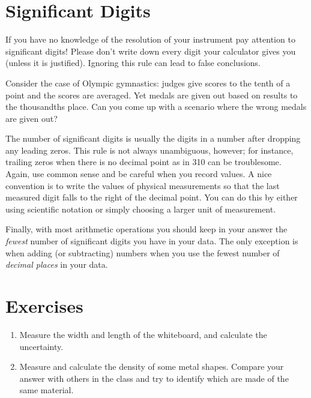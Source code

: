 \section{Significant Digits}

If you have no knowledge of the resolution of your instrument pay attention to significant
digits!  Please don't write down every digit your calculator gives you (unless
it is justified).  Ignoring this rule can lead to false conclusions.

Consider the case of Olympic gymnastics: judges give scores to the tenth of a
point and the scores are averaged.  Yet medals are given out based on results to
the thousandths place.  Can you come up with a scenario where the wrong medals
are given out?

The number of significant digits is usually the digits in a number after
dropping any leading zeros.  This rule is not always unambiguous, however; for
instance, trailing zeros when there is no decimal point as in 310 can be
troublesome.  Again, use common sense and be careful when you record values.  A
nice convention is to write the values of physical measurements so that the last
measured digit falls to the right of the decimal point.  You can do this by
either using scientific notation or simply choosing a larger unit of
measurement.

Finally, with most arithmetic operations you should keep in your answer the {\em
  fewest} number of significant digits you have in your data.  The only
exception is when adding (or subtracting) numbers when you use the fewest number
of {\em decimal places} in your data.

\section{Exercises}

\begin{enumerate}
\item Measure the width and length of the whiteboard, and calculate the
  uncertainty.
  
\item Measure and calculate the density of some metal shapes.  Compare your
  answer with others in the class and try to identify which are made of the same
  material. 

\end{enumerate}
